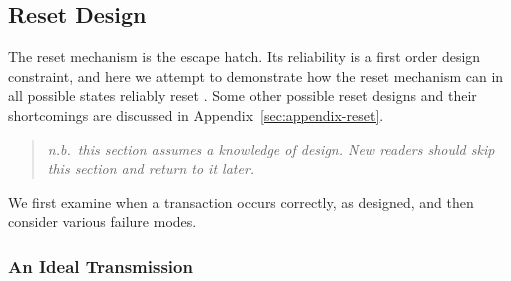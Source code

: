 \subsection{Reset Design}
\label{sec:design-reset}
The reset mechanism is the \bus escape hatch. Its reliability is a first
order design constraint, and here we attempt to demonstrate how the reset
mechanism can in all possible states reliably reset \bus. Some other possible
reset designs and their shortcomings are discussed in
Appendix~\ref{sec:appendix-reset}.
\begin{quote}
\em n.b.\ this section assumes a knowledge of \bus design. New readers should
skip this section and return to it later.
\end{quote}

We first examine when a transaction occurs correctly, as designed, and then
consider various failure modes.

\subsubsection{An Ideal Transmission}
~

